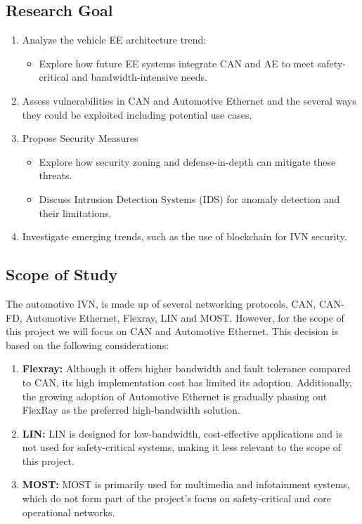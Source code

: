 \documentclass{report}
\begin{document}
\subsection{Research Goal}
\begin{enumerate}
    \item Analyze the vehicle EE architecture trend:
    \begin{itemize}
        \item Explore how future EE systems integrate CAN and AE to meet safety-critical and bandwidth-intensive needs.
    \end{itemize}
    \item Assess vulnerabilities in CAN and Automotive Ethernet and the several ways they could be exploited including potential use cases.
    \item Propose Security Measures
    \begin{itemize}
        \item Explore how security zoning and defense-in-depth can mitigate these threats.
        \item Discuss Intrusion Detection Systems (IDS) for anomaly detection and their limitations.
    \end{itemize}
    \item Investigate emerging trends, such as the use of blockchain for IVN security.
\end{enumerate}


\subsection{Scope of Study}
The automotive IVN, is made up of several networking protocols, CAN, CAN-FD, Automotive Ethernet, Flexray, LIN and MOST. However, for the scope of this project we will focus on CAN and Automotive Ethernet. This decision is based on the following considerations:

\begin{enumerate}
    \item \textbf{Flexray:} Although it offers higher bandwidth and fault tolerance compared to CAN, its high implementation cost has limited its adoption. Additionally, the growing adoption of Automotive Ethernet is gradually phasing out FlexRay as the preferred high-bandwidth solution.
    \item \textbf{LIN:} LIN is designed for low-bandwidth, cost-effective applications and is not used for safety-critical systems, making it less relevant to the scope of this project.
    \item \textbf{MOST:} MOST is primarily used for multimedia and infotainment systems, which do not form part of the project's focus on safety-critical and core operational networks.
\end{enumerate}
\end{document}
